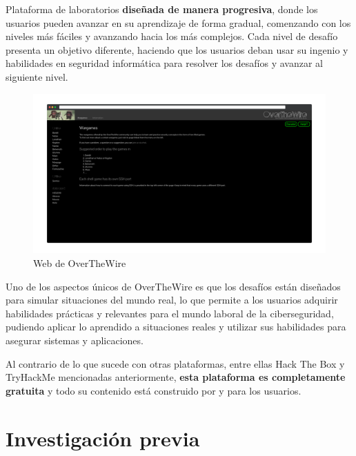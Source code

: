         Plataforma de laboratorios \textbf{diseñada de manera progresiva}, donde los usuarios pueden avanzar en su aprendizaje de forma gradual, comenzando con los niveles más fáciles y avanzando hacia los más complejos. Cada nivel de desafío presenta un objetivo diferente, haciendo que los usuarios deban usar su ingenio y habilidades en seguridad informática para resolver los desafíos y avanzar al siguiente nivel.
        
        \begin{figure}[h]
            \centering

            \includegraphics[width=\textwidth]{images/Capturas/Web de OverTheWire.png}

            \caption{Web de OverTheWire}
            \label{fig:OverTheWire-web}
        \end{figure}
        
        Uno de los aspectos únicos de OverTheWire es que los desafíos están diseñados para simular situaciones del mundo real, lo que permite a los usuarios adquirir habilidades prácticas y relevantes para el mundo laboral de la ciberseguridad, pudiendo aplicar lo aprendido a situaciones reales y utilizar sus habilidades para asegurar sistemas y aplicaciones.
        
        Al contrario de lo que sucede con otras plataformas, entre ellas Hack The Box y TryHackMe mencionadas anteriormente, \textbf{esta plataforma es completamente gratuita} y todo su contenido está construido por y para los usuarios.
        
        \cleardoublepage
    
    

\chapter{Investigación previa}
    \label{cap:investigacion-previa}

